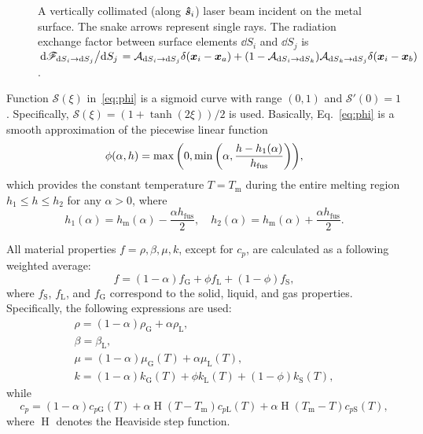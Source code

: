 \documentclass[final]{elsarticle} %
\DeclareMathOperator{\Heaviside}{H}
\newcommand{\fusion}[1]{{#1}_\text{fus}}
\newcommand{\Abso}{\mathcal{A}}
\newcommand{\sol}{\text{S}}
\newcommand{\liq}{\text{L}}
\newcommand{\gas}{\text{G}}
\newcommand{\melt}{\text{m}}
\newcommand{\viewfactor}[3]{{#1}_{\dd{S}#2\to\dd{S}#3}}
\newcommand{\bs}{\vu*{s}}
\newcommand{\bx}{\vb*{x}}
\begin{document}
\begin{figure}
    \caption{
        A vertically collimated (along $\bs_i$) laser beam incident on the metal surface.
        The snake arrows represent single rays.
        The radiation exchange factor between surface elements $\dd{S_i}$ and $\dd{S_j}$ is
        $\dv*{\viewfactor{\mathscr{F}}{_i}{_j}}{S_j} = \viewfactor{\Abso}{_i}{_j}\delta(\bx_i-\bx_a)
            + (1-\viewfactor{\Abso}{_i}{_k})\viewfactor{\Abso}{_k}{_j}\delta(\bx_i-\bx_b)$.
    }
    \label{fig:exchange_factor}
\end{figure}

Function $\mathcal{S}(\xi)$ in~\eqref{eq:phi} is a sigmoid curve with range $(0,1)$
and $\mathcal{S}'(0) = 1$.
Specifically, $\mathcal{S}(\xi) = (1+\tanh(2\xi))/2$ is used.
Basically, Eq.~\eqref{eq:phi} is a smooth approximation of the piecewise linear function
\begin{equation}\label{eq:phi_piecewise}
    \phi(\alpha,h) = \max\qty(0,\min\qty(\alpha,\frac{h-h_1(\alpha)}{\fusion{h}})),
\end{equation}
which provides the constant temperature $T=T_\melt$ during the entire melting region
$h_1\leq h\leq h_2$ for any $\alpha>0$, where
\begin{equation}\label{eq:enthalpySL}
    h_1(\alpha) = h_\melt(\alpha) - \frac{\alpha\fusion{h}}2, \quad
    h_2(\alpha) = h_\melt(\alpha) + \frac{\alpha\fusion{h}}2.
\end{equation}

All material properties $f = \rho, \beta, \mu, k$, except for $c_p$,
are calculated as a following weighted average:
\begin{equation}\label{eq:properties}
    f = (1-\alpha)f_\gas + \phi f_\liq + (1-\phi)f_\sol,
\end{equation}
where $f_\sol$, $f_\liq$, and $f_\gas$ correspond to the solid, liquid, and gas properties.
Specifically, the following expressions are used:
\begin{gather}
    \rho = (1-\alpha)\rho_\gas + \alpha\rho_\liq, \label{eq:rho}\\
    \beta = \beta_\liq, \label{eq:beta}\\
    \mu = (1-\alpha)\mu_\gas(T) + \alpha\mu_\liq(T), \label{eq:mu}\\
    k = (1-\alpha)k_\gas(T) + \phi k_\liq(T) + (1-\phi)k_\sol(T), \label{eq:k}
\end{gather}
while
\begin{equation}\label{eq:c_p}
    c_p = (1-\alpha)c_{p\gas}(T) + \alpha\Heaviside(T-T_\melt)c_{p\liq}(T)
        + \alpha\Heaviside(T_\melt-T)c_{p\sol}(T),
\end{equation}
where $\Heaviside$ denotes the Heaviside step function.
\end{document}
